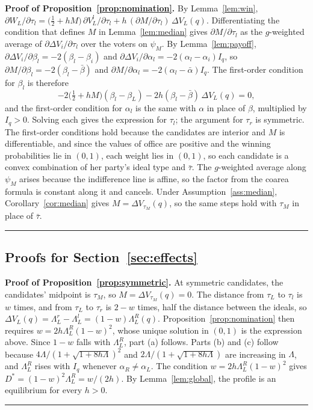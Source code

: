\documentclass[12pt,letterpaper]{article}
\newenvironment{proof}[1][Proof]{\noindent\textbf{#1.} }{\ \rule{0.5em}{0.5em}}
\begin{document}
\begin{proof}[Proof of Proposition~\ref{prop:nomination}]
By Lemma~\ref{lem:win}, $\partial W_L/\partial\tau_l=\big(\tfrac12+hM\big)\,\partial V_L^l/\partial\tau_l+h\,(\partial M/\partial\tau_l)\,\Delta V_L(q)$. Differentiating the condition that defines $M$ in Lemma~\ref{lem:median} gives $\partial M/\partial\tau_l$ as the $g$-weighted average of $\partial\Delta V_i/\partial\tau_l$ over the voters on $\psi_M$. By Lemma~\ref{lem:payoff}, $\partial\Delta V_i/\partial\beta_l=-2(\beta_l-\beta_i)$ and $\partial\Delta V_i/\partial\alpha_l=-2(\alpha_l-\alpha_i)I_q$, so $\partial M/\partial\beta_l=-2(\beta_l-\bar\beta)$ and $\partial M/\partial\alpha_l=-2(\alpha_l-\bar\alpha)I_q$. The first-order condition for $\beta_l$ is therefore
\[
-2\Big(\tfrac12+hM\Big)(\beta_l-\beta_L)-2h(\beta_l-\bar\beta)\,\Delta V_L(q)=0,
\]
and the first-order condition for $\alpha_l$ is the same with $\alpha$ in place of $\beta$, multiplied by $I_q>0$. Solving each gives the expression for $\tau_l$; the argument for $\tau_r$ is symmetric. The first-order conditions hold because the candidates are interior and $M$ is differentiable, and since the values of office are positive and the winning probabilities lie in $(0,1)$, each weight lies in $(0,1)$, so each candidate is a convex combination of her party's ideal type and $\bar\tau$. The $g$-weighted average along $\psi_M$ arises because the indifference line is affine, so the factor from the coarea formula is constant along it and cancels. Under Assumption~\ref{ass:median}, Corollary~\ref{cor:median} gives $M=\Delta V_{\tau_M}(q)$, so the same steps hold with $\tau_M$ in place of $\bar\tau$.
\end{proof}

\subsection*{Proofs for Section~\ref{sec:effects}}

\begin{proof}[Proof of Proposition~\ref{prop:symmetric}]
At symmetric candidates, the candidates' midpoint is $\tau_M$, so $M=\Delta V_{\tau_M}(q)=0$. The distance from $\tau_L$ to $\tau_l$ is $w$ times, and from $\tau_L$ to $\tau_r$ is $2-w$ times, half the distance between the ideals, so $\Delta V_L(q)=\Lambda_L^r-\Lambda_L^l=(1-w)\Lambda_L^R(q)$. Proposition~\ref{prop:nomination} then requires $w=2h\Lambda_L^R(1-w)^2$, whose unique solution in $(0,1)$ is the expression above. Since $1-w$ falls with $\Lambda_L^R$, part (a) follows. Parts (b) and (c) follow because $4\Lambda/(1+\sqrt{1+8h\Lambda})^2$ and $2\Lambda/(1+\sqrt{1+8h\Lambda})$ are increasing in $\Lambda$, and $\Lambda_L^R$ rises with $I_q$ whenever $\alpha_R\ne\alpha_L$.
The condition $w=2h\Lambda_L^R(1-w)^2$ gives $D^*=(1-w)^2\Lambda_L^R=w/(2h)$. By Lemma~\ref{lem:global}, the profile is an equilibrium for every $h>0$.
\end{proof}
\end{document}
